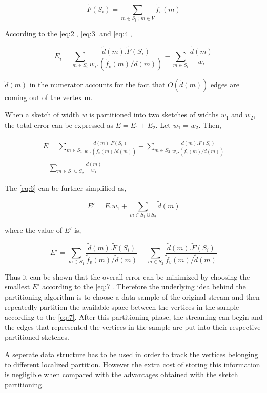 \begin{equation}
    \tilde{F}(S_i) = \sum_{m \in S_i \: ; \: m \in V}^{} \tilde{f}_v(m)
    \label{eq:4}
\end{equation}

According to the \eqref{eq:2}, \eqref{eq:3} and \eqref{eq:4},

\begin{equation}
    E_i = \sum_{m \in S_i}^{} \frac{\tilde{d}(m) . \tilde{F}(S_i)}{w_i . (\tilde{f}_v(m) / \tilde{d}(m))} - \sum_{m \in S_i}^{} \frac{\tilde{d}(m)}{w_i}
    \label{eq:5}
\end{equation}

\(\tilde{d}(m)\) in the numerator accounts for the fact that \(O(\tilde{d}(m))\) edges are coming out of the vertex m.

When a sketch of width \(w\) is partitioned into two sketches of widths \(w_1\) and \(w_2\), the total error can be expressed as \(E = E_1 + E_2\). Let \(w_1 = w_2\). Then,

\begin{multline}
    E = \sum_{m \in S_1}^{} \frac{\tilde{d}(m) . \tilde{F}(S_i)}{w_1 . (\tilde{f}_v(m) / \tilde{d}(m))} + \sum_{m \in S_2}^{} \frac{\tilde{d}(m) . \tilde{F}(S_i)}{w_2 . (\tilde{f}_v(m) / \tilde{d}(m))}\\ - \sum_{m \in S_1 \cup S_2}^{} \frac{\tilde{d}(m)}{w_1}
    \label{eq:6}
\end{multline}

The \eqref{eq:6} can be further simplified as,

\begin{equation}
    E' = E . w_1 + \sum_{m \in S_1 \cup S_2}^{} \tilde{d}(m)
\end{equation}

where the value of \(E'\) is,

\begin{equation}
    E' = \sum_{m \in S_1}^{} \frac{\tilde{d}(m) . \tilde{F}(S_i)}{\tilde{f}_v(m) / \tilde{d}(m)} + \sum_{m \in S_2}^{} \frac{\tilde{d}(m) . \tilde{F}(S_i)}{\tilde{f}_v(m) / \tilde{d}(m)}
    \label{eq:7}
\end{equation}

Thus it can be shown that the overall error can be minimized by choosing the smallest \(E'\) according to the \eqref{eq:7}. Therefore the underlying idea behind the partitioning algorithm is to choose a data sample of the original stream and then repeatedly partition the available space between the vertices in the sample according to the \eqref{eq:7}. After this partitioning phase, the streaming can begin and the edges that represented the vertices in the sample are put into their respective partitioned sketches.

A seperate data structure has to be used in order to track the vertices belonging to different localized partition. However the extra cost of storing this information is negligible when compared with the advantages obtained with the sketch partitioning.